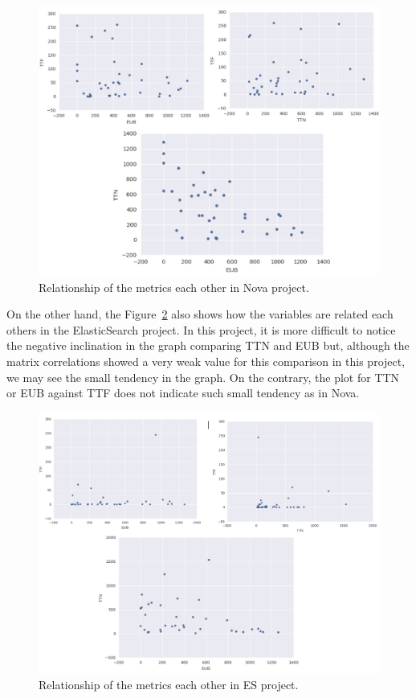 \documentclass[10pt, conference]{IEEEtran}
\begin{document}
\begin{figure}[ht]
\centering
\includegraphics[width=\columnwidth]{DistributionNova_b.png}
\caption{ Relationship of the metrics each other in Nova project. 
}
\label{fig:graph}       %
\end{figure}

On the other hand, the Figure~\ref{fig:graph1} also shows how the variables are related each others in the ElasticSearch project. In this project, it is more difficult to notice the negative inclination in the graph comparing TTN and EUB but, although the matrix correlations showed a very weak value for this comparison in this project, we may see the small tendency in the graph. On the contrary, the plot for TTN or EUB against TTF does not indicate such small tendency as in Nova.
\begin{figure}[ht]
\centering
\includegraphics[width=\columnwidth]{DistributionES_b.png}
\caption{Relationship of the metrics each other in ES project. }
\label{fig:graph1}       %
\end{figure}
 
\end{document}
